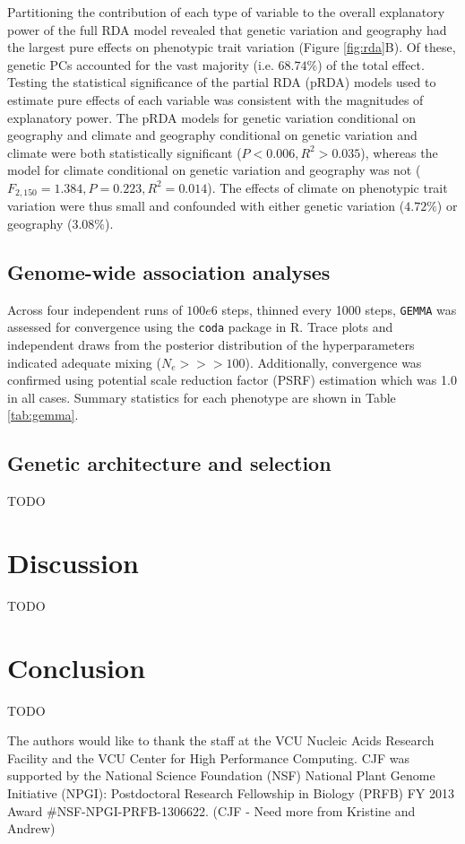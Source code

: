 \documentclass[smallextended]{svjour3}
\begin{document}
Partitioning the contribution of each type of variable to the overall
explanatory power of the full RDA model revealed that
genetic variation and geography had the largest pure effects on phenotypic
trait
variation (Figure \ref{fig:rda}B). Of these, genetic PCs accounted for the vast
majority
(i.e. $68.74\%$) of the total effect. Testing the statistical significance of
the partial RDA (pRDA) models used to estimate pure effects of each variable
was
consistent with the magnitudes of explanatory power. The pRDA models for
genetic
variation conditional on geography and climate and geography conditional on
genetic variation and climate were both statistically significant ($P < 0.006,
R^2 > 0.035$), whereas the model for climate conditional on genetic variation
and geography was not ($F_{2,150} = 1.384, P = 0.223, R^2 = 0.014$). The
effects
of climate on phenotypic trait variation were thus small and confounded with
either genetic variation ($4.72\%$) or geography ($3.08\%$).


\subsection*{Genome-wide association analyses}
Across four independent runs of $100e6$ steps, thinned every 1000 steps,
\texttt{GEMMA}
was assessed 
for convergence using the \texttt{coda} \citep[][version 0.18.1]{coda} package
in R. Trace plots and independent 
draws from the posterior distribution of the hyperparameters indicated adequate
mixing 
($N_e >>> 100$). Additionally, convergence was confirmed using potential scale
reduction factor 
(PSRF) estimation which was 1.0 in all cases.  Summary statistics for each
phenotype are shown 
in Table \ref{tab:gemma}.

\subsection*{Genetic architecture and selection}
TODO

\section*{Discussion}
TODO


\section*{Conclusion}
TODO


\begin{acknowledgements} The authors would like to thank the staff at
the VCU Nucleic Acids Research Facility and the
VCU Center for High Performance Computing.  CJF was supported by the National
Science Foundation (NSF) National Plant Genome Initiative (NPGI): Postdoctoral
Research Fellowship in Biology (PRFB) FY 2013 Award \#NSF-NPGI-PRFB-1306622.
(CJF - Need more from Kristine and Andrew)
\end{acknowledgements}
\end{document}
